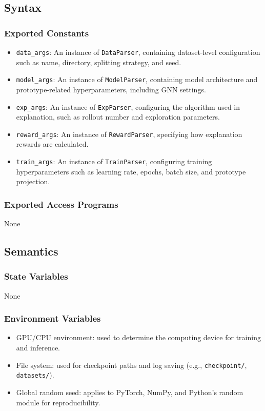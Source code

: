 \documentclass[12pt, titlepage]{article}
\begin{document}
\subsection{Syntax}

\subsubsection{Exported Constants}
\begin{itemize}
  \item \texttt{data\_args}: An instance of \texttt{DataParser}, containing dataset-level configuration such as name, directory, splitting strategy, and seed.
  \item \texttt{model\_args}: An instance of \texttt{ModelParser}, containing model architecture and prototype-related hyperparameters, including GNN settings.
  \item \texttt{exp\_args}: An instance of \texttt{ExpParser}, configuring the algorithm used in explanation, such as rollout number and exploration parameters.
  \item \texttt{reward\_args}: An instance of \texttt{RewardParser}, specifying how explanation rewards are calculated.
  \item \texttt{train\_args}: An instance of \texttt{TrainParser}, configuring training hyperparameters such as learning rate, epochs, batch size, and prototype projection.
\end{itemize}

\subsubsection{Exported Access Programs}
None

\subsection{Semantics}

\subsubsection{State Variables}
None

\subsubsection{Environment Variables}
\begin{itemize}
  \item GPU/CPU environment: used to determine the computing device for training and inference.
  \item File system: used for checkpoint paths and log saving (e.g., \texttt{checkpoint/}, \texttt{datasets/}).
  \item Global random seed: applies to PyTorch, NumPy, and Python’s random module for reproducibility.
\end{itemize}
\end{document}
